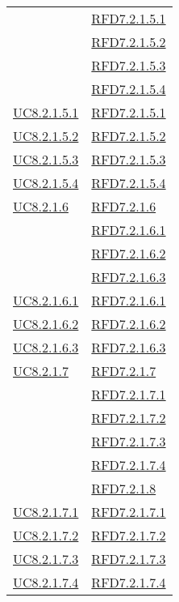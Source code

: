 \begin{longtable}{|>{\centering}m{5cm}|m{5cm}<{\centering}|}
& \hyperlink{RFD7.2.1.5.1}{RFD7.2.1.5.1}\\
& \hyperlink{RFD7.2.1.5.2}{RFD7.2.1.5.2}\\
& \hyperlink{RFD7.2.1.5.3}{RFD7.2.1.5.3}\\
& \hyperlink{RFD7.2.1.5.4}{RFD7.2.1.5.4}\\ \hline
\hyperref[UC8.2.1.5.1]{UC8.2.1.5.1} & \hyperlink{RFD7.2.1.5.1}{RFD7.2.1.5.1}\\ \hline
\hyperref[UC8.2.1.5.2]{UC8.2.1.5.2} & \hyperlink{RFD7.2.1.5.2}{RFD7.2.1.5.2}\\ \hline
\hyperref[UC8.2.1.5.3]{UC8.2.1.5.3} & \hyperlink{RFD7.2.1.5.3}{RFD7.2.1.5.3}\\ \hline
\hyperref[UC8.2.1.5.4]{UC8.2.1.5.4} & \hyperlink{RFD7.2.1.5.4}{RFD7.2.1.5.4}\\ \hline
\hyperref[UC8.2.1.6]{UC8.2.1.6} & \hyperlink{RFD7.2.1.6}{RFD7.2.1.6}\\
& \hyperlink{RFD7.2.1.6.1}{RFD7.2.1.6.1}\\
& \hyperlink{RFD7.2.1.6.2}{RFD7.2.1.6.2}\\
& \hyperlink{RFD7.2.1.6.3}{RFD7.2.1.6.3}\\ \hline
\hyperref[UC8.2.1.6.1]{UC8.2.1.6.1} & \hyperlink{RFD7.2.1.6.1}{RFD7.2.1.6.1}\\ \hline
\hyperref[UC8.2.1.6.2]{UC8.2.1.6.2} & \hyperlink{RFD7.2.1.6.2}{RFD7.2.1.6.2}\\ \hline
\hyperref[UC8.2.1.6.3]{UC8.2.1.6.3} & \hyperlink{RFD7.2.1.6.3}{RFD7.2.1.6.3}\\ \hline
\hyperref[UC8.2.1.7]{UC8.2.1.7} & \hyperlink{RFD7.2.1.7}{RFD7.2.1.7}\\
& \hyperlink{RFD7.2.1.7.1}{RFD7.2.1.7.1}\\
& \hyperlink{RFD7.2.1.7.2}{RFD7.2.1.7.2}\\
& \hyperlink{RFD7.2.1.7.3}{RFD7.2.1.7.3}\\
& \hyperlink{RFD7.2.1.7.4}{RFD7.2.1.7.4}\\
& \hyperlink{RFD7.2.1.8}{RFD7.2.1.8}\\ \hline
\hyperref[UC8.2.1.7.1]{UC8.2.1.7.1} & \hyperlink{RFD7.2.1.7.1}{RFD7.2.1.7.1}\\ \hline
\hyperref[UC8.2.1.7.2]{UC8.2.1.7.2} & \hyperlink{RFD7.2.1.7.2}{RFD7.2.1.7.2}\\ \hline
\hyperref[UC8.2.1.7.3]{UC8.2.1.7.3} & \hyperlink{RFD7.2.1.7.3}{RFD7.2.1.7.3}\\ \hline
\hyperref[UC8.2.1.7.4]{UC8.2.1.7.4} & \hyperlink{RFD7.2.1.7.4}{RFD7.2.1.7.4}\\ \hline

\end{longtable}
